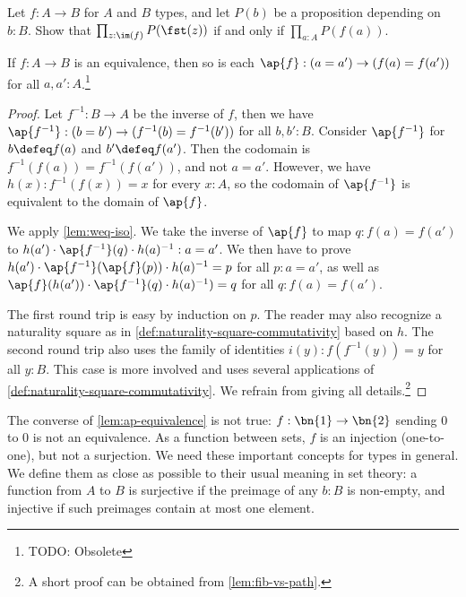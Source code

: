 \begin{xca}\label{xca:all-prop-image}
Let $f:A\to B$ for $A$ and $B$ types, and let $P(b)$ be a proposition
depending on $b:B$.
Show that $\prod_{z:\im(f)} P(\fst(z))$ if and only if $\prod_{a:A} P(f(a))$.
\end{xca}

\begin{lemma}\label{lem:ap-equivalence}
If $f:A\to B$ is an equivalence, then so is each
$\ap{f}: (a=a') \to (f(a)=f(a'))$ for all $a,a':A$.\footnote{%
  TODO: Obsolete}
\end{lemma}
\begin{proof}
Let $f^{-1} : B\to A$ be the inverse of $f$, then we have
$\ap{f^{-1}}: (b=b') \to (f^{-1}(b)=f^{-1}(b'))$ for all $b,b':B$.
Consider $\ap{f^{-1}}$ for $b\defeq f(a)$ and $b'\defeq f(a')$.
Then the codomain is $f^{-1}(f(a))=f^{-1}(f(a'))$, and not $a=a'$.
However, we have $h(x):f^{-1}(f(x))=x$ for every $x:A$, so the
codomain of $\ap{f^{-1}}$ is equivalent to the domain of $\ap{f}$.

We apply \cref{lem:weq-iso}.
We take the inverse of $\ap{f}$ to map $q: f(a)=f(a')$
to $h(a')\cdot{\ap{f^{-1}}(q)}\cdot {h(a)^{-1}} : a=a'$.
We then have to prove $h(a')\cdot{\ap{f^{-1}}(\ap{f}(p))}\cdot {h(a)^{-1}} = p$
for all $p: a=a'$, as well as
$\ap{f}(h(a'))\cdot\ap{f^{-1}}(q)\cdot {h(a)^{-1}})=q$ for all $q: f(a)=f(a')$.

The first round trip is easy by induction on $p$. The reader may also recognize a
naturality square as in \cref{def:naturality-square-commutativity} based on $h$.
The second round trip also uses the family of identities $i(y):f(f^{-1}(y))=y$ for all $y:B$.
This case is more involved and uses several applications of \cref{def:naturality-square-commutativity}.
We refrain from giving all details.\footnote{%
A short proof can be obtained from \cref{lem:fib-vs-path}.}
\end{proof}

The converse of \cref{lem:ap-equivalence} is not
true: $f:\bn{1}\to\bn{2}$ sending $0$ to $0$ is not an
equivalence. As a function between sets,
$f$ is an injection (one-to-one), but not a surjection.
We need these important concepts for types in general.
We define them as close as possible to their
usual meaning in set theory: a function from $A$ to $B$ is
surjective if the preimage of any $b:B$ is non-empty,
and injective if such preimages contain at most one element.

